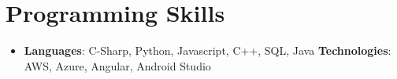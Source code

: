 \documentclass[letterpaper,11pt]{article}
\newcommand{\resumeSubHeadingListStart}{\begin{itemize}[leftmargin=*]}
\newcommand{\resumeSubHeadingListEnd}{\end{itemize}}
\begin{document}
\section{Programming Skills}
  \resumeSubHeadingListStart
    \item{
      \textbf{Languages}{: C-Sharp, Python, Javascript, C++, SQL, Java}
      \hfill
      \textbf{Technologies}{: AWS, Azure, Angular, Android Studio}
    }
  \resumeSubHeadingListEnd

\end{document}
